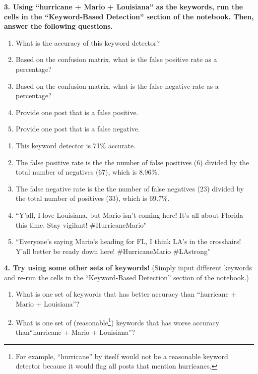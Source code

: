 \documentclass{article}
\begin{document}
\textbf{3. Using ``hurricane + Mario + Louisiana'' as the keywords, run the cells in the ``Keyword-Based Detection'' section of the notebook. Then, answer the following questions.}
\begin{enumerate}[label=\Alph*.]
    \item What is the accuracy of this keyword detector?
    \item Based on the confusion matrix, what is the false positive rate as a percentage? 
    \item Based on the confusion matrix, what is the false negative rate as a percentage?
    \item Provide one post that is a false positive.
    \item Provide one post that is a false negative.
\end{enumerate}


\bigskip
\begin{mdframed}
\begin{enumerate}[label=\Alph*.]
    \item This keyword detector is 71\% accurate.
    \item The false positive rate is the the number of false positives (6) divided by the total number of negatives (67), which is 8.96\%.
    \item The false negative rate is the the number of false negatives (23) divided by the total number of positives (33), which is 69.7\%.
    \item ``Y'all, I love Louisiana, but Mario isn't coming here! It's all about Florida this time. Stay vigilant! \#HurricaneMario"
    \item ``Everyone’s saying Mario's heading for FL, I think LA's in the crosshairs! Y’all better be ready down here! \#HurricaneMario \#LAstrong"
\end{enumerate}
\end{mdframed}
\bigskip

\textbf{4. Try using some other sets of keywords!} (Simply input different keywords and re-run the cells in the ``Keyword-Based Detection'' section of the notebook.)
\begin{enumerate}[label=\Alph*.]
    \item What is one set of keywords that has better accuracy than ``hurricane + Mario + Louisiana''?
    \item What is one set of (reasonable\footnote{For example, ``hurricane'' by itself would not be a reasonable keyword detector because it would flag all posts that mention hurricanes.}) keywords that has worse accuracy than``hurricane + Mario + Louisiana''?
\end{enumerate}
\end{document}
